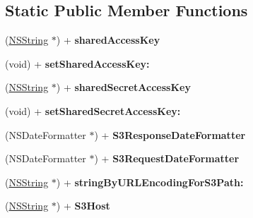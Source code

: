 \subsection*{\-Static \-Public \-Member \-Functions}
\begin{DoxyCompactItemize}
\item 
\hypertarget{interface_a_s_i_s3_request_aadbf1f29ab30efc3f4640bac7b508d32}{
(\hyperlink{class_n_s_string}{\-N\-S\-String} $\ast$) + {\bfseries shared\-Access\-Key}}
\label{interface_a_s_i_s3_request_aadbf1f29ab30efc3f4640bac7b508d32}

\item 
\hypertarget{interface_a_s_i_s3_request_ad944a2a1b20fc9e4559c8faf4f41b977}{
(void) + {\bfseries set\-Shared\-Access\-Key\-:}}
\label{interface_a_s_i_s3_request_ad944a2a1b20fc9e4559c8faf4f41b977}

\item 
\hypertarget{interface_a_s_i_s3_request_af1a72a1aacc05ce3f5def339d3bfbd5f}{
(\hyperlink{class_n_s_string}{\-N\-S\-String} $\ast$) + {\bfseries shared\-Secret\-Access\-Key}}
\label{interface_a_s_i_s3_request_af1a72a1aacc05ce3f5def339d3bfbd5f}

\item 
\hypertarget{interface_a_s_i_s3_request_aca8ba2305c0cbee1d7ec8553831768ff}{
(void) + {\bfseries set\-Shared\-Secret\-Access\-Key\-:}}
\label{interface_a_s_i_s3_request_aca8ba2305c0cbee1d7ec8553831768ff}

\item 
\hypertarget{interface_a_s_i_s3_request_a853f6e4d32bb84b408c169646d11f56a}{
(\-N\-S\-Date\-Formatter $\ast$) + {\bfseries \-S3\-Response\-Date\-Formatter}}
\label{interface_a_s_i_s3_request_a853f6e4d32bb84b408c169646d11f56a}

\item 
\hypertarget{interface_a_s_i_s3_request_a5786d581fbc83cba6a0da6b94f1b9376}{
(\-N\-S\-Date\-Formatter $\ast$) + {\bfseries \-S3\-Request\-Date\-Formatter}}
\label{interface_a_s_i_s3_request_a5786d581fbc83cba6a0da6b94f1b9376}

\item 
\hypertarget{interface_a_s_i_s3_request_aab8bdd9f5d8970a3bcfca36ec9dee9fb}{
(\hyperlink{class_n_s_string}{\-N\-S\-String} $\ast$) + {\bfseries string\-By\-U\-R\-L\-Encoding\-For\-S3\-Path\-:}}
\label{interface_a_s_i_s3_request_aab8bdd9f5d8970a3bcfca36ec9dee9fb}

\item 
\hypertarget{interface_a_s_i_s3_request_ae49e83f64fb2490185d0a9ff3649e1d3}{
(\hyperlink{class_n_s_string}{\-N\-S\-String} $\ast$) + {\bfseries \-S3\-Host}}
\label{interface_a_s_i_s3_request_ae49e83f64fb2490185d0a9ff3649e1d3}


\end{DoxyCompactItemize}

